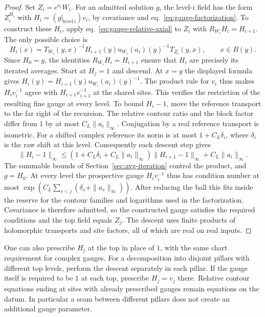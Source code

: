 \documentclass[11pt,letterpaper,reqno]{amsart}
\numberwithin{equation}{section}
\renewcommand{\eqref}[1]{\textup{eq.~\ref{#1}}}
\theoremstyle{definition}
\theoremstyle{remark}
\begin{document}
\begin{proof}
Set \(Z_i=e^{a_i}W_i\). For an admitted solution \(g\), the
level-\(i\) field has the form \(Z_i^{H_i}\) with
\(H_i=(g|_{\mathrm{level}\ i})v_i\), by covariance and
\eqref{eq:gauge-factorization}. To construct these \(H_i\),
apply \eqref{eq:gauge-relative-axial} to \(Z_i\) with
\(R_{W_i}H_i=H_{i+1}\). The only possible choice is
\[
 H_i(x)=T_{W_i}(y,x)^{-1}H_{i+1}(y)
       u_{W_i}(a_i)(y)^{-1}T_{Z_i}(y,x),
   \qquad x\in B(y).
\]
Since \(H_0=g\), the identities \(R_{W_i}H_i=H_{i+1}\) ensure
that \(H_i\) are precisely its iterated averages. Start at \(H_j=1\)
and descend. At \(x=y\) the displayed formula gives
\(H_i(y)=H_{i+1}(y)u_{W_i}(a_i)(y)^{-1}\).
The product rule for \(v_i\) thus makes
\(H_iv_i^{-1}\) agree with \(H_{i+1}v_{i+1}^{-1}\) at the shared
sites. This verifies the restriction of the resulting fine gauge at
every level. To bound \(H_i-1\), move the
reference transport to the far right of the recursion. The relative
contour ratio and the block factor differ from \(1\) by at most
\(C_L\|a_i\|_\infty\). Conjugation by a real reference transport is
isometric. For a shifted complex reference its norm is at most
\(1+C_L\delta_i\), where \(\delta_i\) is the raw shift at this level.
Consequently each descent step gives
\[
 \|H_i-1\|_\infty\le
 (1+C_L\delta_i+C_L\|a_i\|_\infty)\|H_{i+1}-1\|_\infty
     +C_L\|a_i\|_\infty .
\]
The summable bounds of Section~\ref{sec:avg-iteration} control the
product, and \(g=H_0\). At every level the prospective gauge
\(H_iv_i^{-1}\) thus has condition number at most
\(\exp(C_L\sum_{s<j}(\delta_s+\|a_s\|_\infty))\).
After reducing the ball this fits inside the reserve for the
contour families and logarithms used in the factorization.
Covariance is therefore admitted, so the constructed gauge
satisfies the required conditions and the top field equals \(Z_j\).
The descent uses finite products of holomorphic transports and
site factors, all of which are real on real inputs.
\end{proof}

One can also prescribe \(H_j\) at the top in place of \(1\),
with the same chart requirement for complex gauges.
For a decomposition into disjoint pillars with different top levels,
perform the descent separately in each pillar. If the gauge itself
is required to be \(1\) at each top, prescribe \(H_j=v_j\) there.
Relative contour equations ending at sites with already prescribed
gauges remain equations on the datum. In particular a seam between
different pillars does not create an additional gauge parameter.
\end{document}

